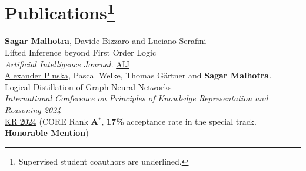 \documentclass[10pt, a4paper]{article}
\newcommand{\years}[1]{\marginnote{\scriptsize #1}}
\begin{document}
\section*{Publications\protect\footnote{Supervised student coauthors are underlined.}}

\years{2025}\textbf{Sagar Malhotra}, \underline{Davide Bizzaro} and Luciano Serafini\\
Lifted Inference beyond First Order Logic \\
\emph{Artificial Intelligence Journal.} \href{https://doi.org/10.1016/j.artint.2025.104310}{AIJ}\\ 


\years{2024}\underline{Alexander Pluska}, Pascal Welke, Thomas G{\"a}rtner and \textbf{Sagar Malhotra}.\\
Logical Distillation of Graph Neural Networks\\
\emph{International Conference on Principles of Knowledge Representation and Reasoning 2024} \\
\href{https://arxiv.org/abs/2406.07126}{KR 2024} (CORE Rank \textbf{A$^{*}$}, \textbf{17\%} acceptance rate in the special track.  \textbf{Honorable Mention})\\
\end{document}
